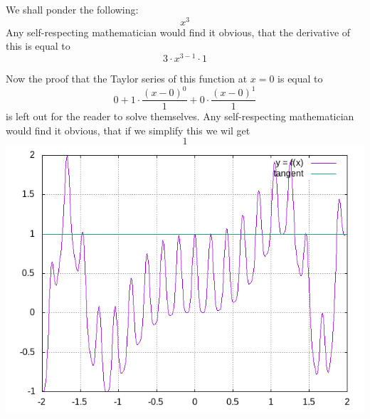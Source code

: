 \documentclass{article}
\begin{document}
We shall ponder the following:
\begin{equation}
x ^{3 } 
\end{equation}
Any self-respecting mathematician would find it obvious, that the derivative of this is equal to
\begin{equation}
3 \cdot x ^{3 - 1 } \cdot 1 
\end{equation}

Now the proof that the Taylor series of this function at $x = 0$ is equal to
\begin{equation}
0 + 1 \cdot \frac{\left( x - 0 \right) ^{0 } }{1 } + 0 \cdot \frac{\left( x - 0 \right) ^{1 } }{1 } 
\end{equation}
is left out for the reader to solve themselves.
Any self-respecting mathematician would find it obvious, that if we simplify this we wil get
\begin{equation}
1 
\end{equation}
\includegraphics{"plot.png"}
\end{document}
